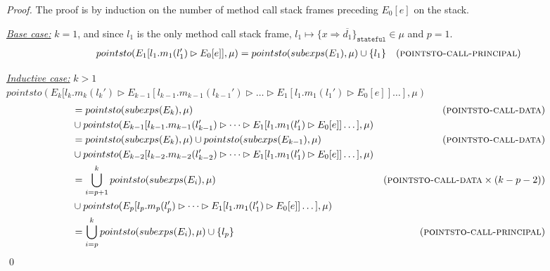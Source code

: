 \documentclass{llncs}
\newcommand{\keywadj}[1]{\mathtt{#1}}
\begin{document}
\begin{proof} The proof is by induction on the number of method call stack frames preceding $E_0[e]$ on the stack.

\noindent\underline{\textit{Base case:}} $k = 1$, and since $l_1$ is the only method call stack frame, $l_1 \mapsto \{ x \Rightarrow \overline{d_1} \}_{\keywadj{stateful}} \in \mu$ and $p = 1$.
\begin{align*}
pointsto(E_1[l_1.m_1(l_1') \rhd E_0[e]], \mu) &= pointsto(subexps(E_1), \mu) \cup \{ l_1 \} & (\textsc{pointsto-call-principal})
\end{align*}

\noindent\underline{\textit{Inductive case:}} $k > 1$\\
\noindent$pointsto(E_k[l_k.m_k(l_k') \rhd E_{k-1}[l_{k-1}.m_{k-1}(l_{k-1}') \rhd \dots \rhd E_1[l_1.m_1(l_1') \rhd E_0[e]] \dots ], \mu)$
\vspace{-7pt}
\begin{align*}
&= pointsto(subexps(E_k), \mu) & (\textsc{pointsto-call-data}) \\
& \cup pointsto(E_{k-1}[l_{k-1}.m_{k-1}(l_{k-1}') \rhd \dots \rhd E_1[l_1.m_1(l_1') \rhd E_0[e]] \dots ], \mu)\\
&= pointsto(subexps(E_k), \mu) \cup pointsto(subexps(E_{k-1}), \mu)& (\textsc{pointsto-call-data}) \\
& \cup pointsto(E_{k-2}[l_{k-2}.m_{k-2}(l_{k-2}') \rhd \dots \rhd E_1[l_1.m_1(l_1') \rhd E_0[e]] \dots ], \mu)\\
&= \bigcup^k_{i = p+1} pointsto(subexps(E_i), \mu) & (\textsc{pointsto-call-data} \times (k - p - 2)) \\
& \cup pointsto(E_p[l_p.m_p(l_p') \rhd \dots \rhd E_1[l_1.m_1(l_1') \rhd E_0[e]] \dots ], \mu)\\
&= \bigcup^k_{i = p} pointsto(subexps(E_i), \mu) \cup \{ l_p \} & (\textsc{pointsto-call-principal})
\end{align*}
\qed
\end{proof}
\end{document}
